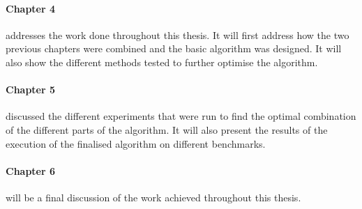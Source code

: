 \paragraph{Chapter 4}addresses the work done throughout this thesis. It will first address how the two previous chapters were combined and the basic algorithm was designed. It will also show the different methods tested to further optimise the algorithm.

\paragraph{Chapter 5}discussed the different experiments that were run to find the optimal combination of the different parts of the algorithm. It will also present the results of the execution of the finalised algorithm on different benchmarks.

\paragraph{Chapter 6}will be a final discussion of the work achieved throughout this thesis.









